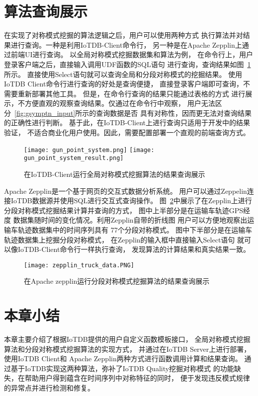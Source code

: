 \section{算法查询展示}

在实现了对称模式挖掘的算法逻辑之后，用户可以使用两种方式
执行算法并对结果进行查询。一种是利用IoTDB-Client命令行，
另一种是在Apache Zepplin上通过前端UI进行查询。
以全局对称模式挖掘数据集和算法为例，
在命令行上，用户登录客户端之后，直接输入调用UDF函数的SQL语句
进行查询，查询结果如图~\ref{fig:iotdb_client_symptn}所示。
直接使用Select语句就可以查询全局和分段对称模式的挖掘结果。
使用IoTDB Client命令行进行查询的好处是查询便捷，
直接登录客户端即可查询，不需要重新部署其他工具。
但是，在命令行查询的结果只能通过表格的方式
进行展示，不方便直观的观察查询结果。仅通过在命令行中观察，
用户无法区分~\ref{fig:gsymptn_input}所示的查询数据是否
具有对称性，因而更无法对查询结果的正确性进行判断。
基于此，在IoTDB-Client上进行查询只适用于开发中的结果验证，
不适合商业化用户使用。因此，需要配置部署一个直观的前端查询方式。
\begin{figure}
    \centering
    {\texttt{[image: gun\_point\_system.png]}}
    {\texttt{[image: gun\_point\_system\_result.png]}}
    \caption{在IoTDB-Client运行全局对称模式挖掘算法的结果查询展示}
    \label{fig:iotdb_client_symptn}
\end{figure}

Apache Zepplin是一个基于网页的交互式数据分析系统。
用户可以通过Zeppelin连接IoTDB数据源并使用SQL进行交互式查询操作。
图~\ref{fig:iotdb_zepplin_symptn}中展示了在Zepplin上进行
分段对称模式挖掘结果计算并查询的方式，
图中上半部分是在运输车轨迹GPS经度
数据集随时间的变化情况。利用Zepplin自带的折线图
用户可以方便地观察出运输车轨迹数据集中的时间序列具有
77个分段对称模式。
图中下半部分是在运输车轨迹数据集上挖掘分段对称模式，
在Zepplin的输入框中直接输入Select语句
就可以像IoTDB-Client命令行一样执行查询，
发现算法的计算结果和真实结果一致。
\begin{figure}
    \centering
    \texttt{[image: zepplin\_truck\_data.PNG]}
    \caption{在Apache zepplin运行分段对称模式挖掘算法的结果查询展示}
    \label{fig:iotdb_zepplin_symptn}
\end{figure}


\section{本章小结}
本章主要介绍了根据IoTDB提供的用户自定义函数模板接口，
全局对称模式挖掘算法和分段对称模式挖掘算法的实现方式，
并通过在IoTDB Server上进行部署，使用IoTDB Client和
Apache Zepplin两种方式进行函数调用计算和结果查询。
通过基于IoTDB实现这两种算法，弥补了IoTDB Quality挖掘对称模式
的功能缺失，在帮助用户得到蕴含在时间序列中对称特征的同时，
便于发现违反模式规律的异常点并进行检测和修复。